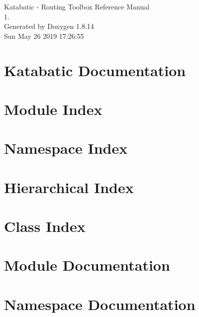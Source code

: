 \documentclass[a4paper]{asimbook}
\begin{document}
   \begin{titlepage}
     \vspace*{7cm}
     \begin{center}
     {\Large Katabatic -\/ Routing Toolbox Reference Manual\\[1ex]\large 1. }\\
     \vspace*{1cm}
     {\large Generated by Doxygen 1.8.14}\\
     \vspace*{0.5cm}
     {\small Sun May 26 2019 17:26:55}\\
     \end{center}
   \end{titlepage}

   \clearemptydoublepage

   \tableofcontents
   \clearemptydoublepage

\chapter{Katabatic Documentation}
\label{index}\hypertarget{index}{}
\chapter{Module Index}

\chapter{Namespace Index}

\chapter{Hierarchical Index}

\chapter{Class Index}

\chapter{Module Documentation}


\chapter{Namespace Documentation}







\end{document}
